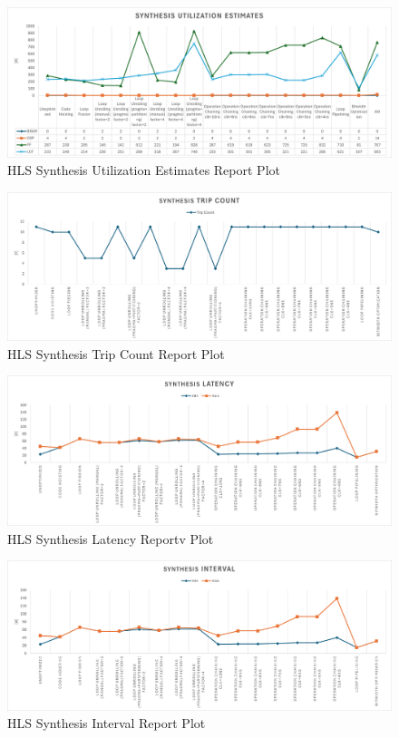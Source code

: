 \begin{figure}[H]
    \centering
    \includegraphics[width=0.7\textheight]{conclusions/hlsutilization.png}
    \caption{HLS Synthesis Utilization Estimates Report Plot}
    \label{fig:hls-synthesis-utilization-estimates-plot}
\end{figure}
\begin{figure}[H]
    \centering
    \includegraphics[width=0.7\textheight]{conclusions/hlstripcount.png}
    \caption{HLS Synthesis Trip Count Report Plot}
    \label{fig:hls-synthesis-trip-count-plot}
\end{figure}
\begin{figure}[H]
    \centering
    \includegraphics[width=0.7\textheight]{conclusions/hlslatency.png}
    \caption{HLS Synthesis Latency Reportv Plot}
    \label{fig:hls-synthesis-latency-plot}
\end{figure}
\begin{figure}[H]
    \centering
    \includegraphics[width=0.7\textheight]{conclusions/hlsinterval.png}
    \caption{HLS Synthesis Interval Report Plot}
    \label{fig:hls-synthesis-interval-plot}
\end{figure}


